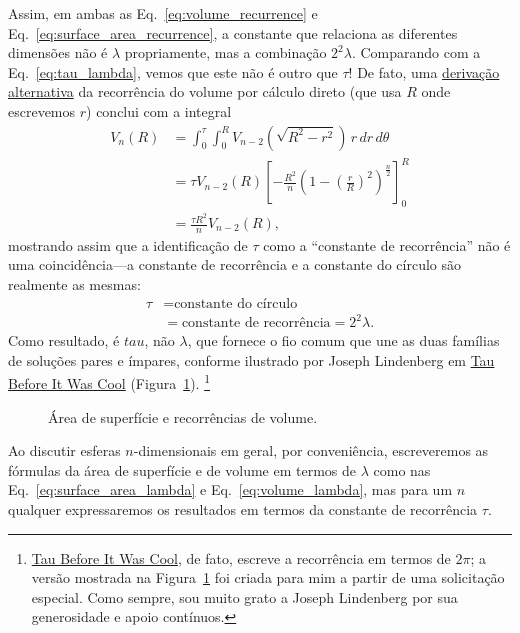 Assim, em ambas as Eq.~\eqref{eq:volume_recurrence} e Eq.~\eqref{eq:surface_area_recurrence}, a constante que relaciona as diferentes dimensões não é $\lambda$ propriamente, mas a combinação $2^2\lambda$. Comparando com a Eq.~\eqref{eq:tau_lambda}, vemos que este não é outro que $\tau$! De fato, uma \href{https://en.wikipedia.org/wiki/Volume_of_an_n-ball#The_two-dimension_recursion_formula}{derivação alternativa} da recorrência do volume por cálculo direto (que usa $R$ onde escrevemos $r$) conclui com a integral
\begin{equation}
\label{eq:integral_recurrence}
\begin{split}
V_n(R) & = \int_0^\tau \int_0^R V_{n-2}\left(\sqrt{R^2 - r^2}\right) \,r\,dr\,d\theta \\
       & = \tau V_{n-2}(R) \left[-\frac{R^2}{n}\left(1 - \left(\frac{r}{R}\right)^2\right)^\frac{n}{2}\right]_{0}^{R} \\
       & = \frac{\tau R^2}{n} V_{n-2}(R),
\end{split}
\end{equation}
mostrando assim que a identificação de $\tau$ como a ``constante de recorrência'' não é uma coincidência---a constante de recorrência e a constante do círculo são realmente as mesmas:
\[
\begin{split}
\tau & = \mbox{constante do círculo} \\
     & = \mbox{constante de recorrência} = 2^2\lambda.
\end{split}
\]
Como resultado, é $tau$, não $\lambda$, que fornece o fio comum que une as duas famílias de soluções pares e ímpares, conforme ilustrado por Joseph Lindenberg em \href{http://sites.google.com/site/taubeforeitwascool/}{Tau Before It Was Cool} (Figura~\ref{fig:Nspheres}). \footnote{\href{http://sites.google.com/site/taubeforeitwascool/}{Tau Before It Was Cool}, de fato, escreve a recorrência em termos de $2\pi$; a versão mostrada na Figura~\ref{fig:Nspheres} foi criada para mim a partir de uma solicitação especial. Como sempre, sou muito grato a Joseph Lindenberg por sua generosidade e apoio contínuos.}

\begin{figure}
\begin{center}
\end{center}
\caption{Área de superfície e recorrências de volume.\label{fig:Nspheres}}
\end{figure}

Ao discutir esferas $n$-dimensionais em geral, por conveniência, \linebreak escreveremos as fórmulas da área de superfície e de volume em termos de $\lambda$ como nas Eq.~\eqref{eq:surface_area_lambda} e Eq.~\eqref{eq:volume_lambda}, mas para um $n$ qualquer expressaremos os resultados em termos da constante de recorrência $\tau$.

